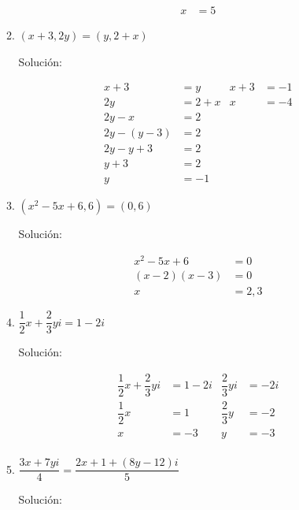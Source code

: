 \documentclass{article}
\theoremstyle{definition}
\begin{document}
\begin{enumerate}
\begin{enumerate}
            \begin{align*}
                x &= 5
            \end{align*}
            \item $(x + 3, 2y) = (y, 2 + x)$
            \begin{center}
                Solución:
            \end{center}
            \begin{align*}
                x + 3 &= y &x + 3 &= -1 \\
                2y &= 2 + x &x &= \boxed{-4} \\
                2y - x &= 2 \\
                2y - (y - 3) &= 2 \\
                2y - y + 3 &= 2 \\
                y + 3 &= 2 \\
                y &= \boxed{-1} 
            \end{align*}
            \item $(x^2-5x+6, 6) = (0,6)$
            \begin{center}
                Solución:
            \end{center}
            \begin{align*}
                x^{2}-5x+6 &= 0 \\
                (x-2)(x-3) &= 0 \\
                x &= \boxed{2, 3}
            \end{align*}
            \item $\dfrac{1}{2}x+\dfrac{2}{3}yi=1-2i$
            \begin{center}
                Solución:
            \end{center}
            \begin{align*}
                \dfrac{1}{2}x+\dfrac{2}{3}yi &= 1-2i &\dfrac{2}{3}yi &= -2i \\
                \dfrac{1}{2}x &= 1 &\dfrac{2}{3}y &= -2 \\
                x &= \boxed{-3} &y &= \boxed{-3} \\
            \end{align*}
            \item $\dfrac{3x+7yi}{4} = \dfrac{2x+1+(8y - 12)i}{5}$
            \begin{center}
                Solución:
            \end{center}
            \begin{align*}

\end{align*}
\end{enumerate}
\end{enumerate}
\end{document}
